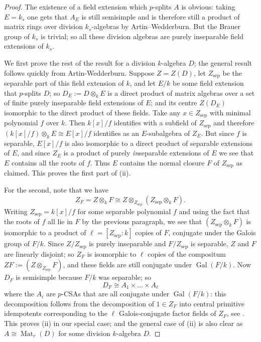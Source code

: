 \documentclass[11pt,reqno]{amsart}
\theoremstyle{definition}
\theoremstyle{remark}
\theoremstyle{definition}
\theoremstyle{plain}
\DeclareMathOperator{\Gal}{Gal}
\DeclareMathOperator{\Mat}{Mat}
\newcommand{\sep}{\mathrm{sep}}
\begin{document}
\begin{proof}
  The existence of a field extension which $p$-splits $A$ is obvious: taking $E=k_s$ one gets that $A_E$ is still semisimple and is therefore still a product of matrix rings over division $k_s$-algebras by Artin--Wedderburn. But the Brauer group of $k_s$ is trivial; so all these division algebras are purely inseparable field extensions of $k_s$.
    
We first prove the rest of the result for a division $k$-algebra $D$; the general result follows quickly from Artin-Wedderburn.
Suppose $Z=Z(D)$, let $Z_\sep$ be the separable part of this field extension of $k$, and
let $E/k$ be some field extension that $p$-splits $D$; so $D_E:=D\otimes_k E$ is a direct product of matrix algebras over a set  of finite purely inseparable field extensions of $E$; and its centre $Z(D_E)$ isomorphic to the direct product of these fields. Take any $x\in Z_\sep$ with minimal polynomial $f$ over $k$. Then $k[x]/f$ identifies with a subfield of $Z_\sep$ and therefore $(k[x]/f)\otimes_k E\cong E[x]/f$ identifies as an $E$-subalgebra of $Z_E$. 
  But since $f$ is separable, $E[x]/f$ is also isomorphic to a direct product of separable extensions of $E$, and since $Z_E$ is a product of purely \emph{in}separable extensions of $E$ we see that $E$ contains all the roots of $f$.
  Thus $E$ contains the normal closure $F$ of $Z_\sep$ as claimed. This proves the first part of (ii).

  For the second, note that we have 
  $$
  Z_F= Z\otimes_k F \cong Z\otimes_{Z_\sep} (Z_\sep\otimes_k F).
  $$ 
  Writing $Z_\sep = k[x]/f$ for some separable polynomial $f$ and using the fact that the roots of $f$ all lie in $F$ by the previous paragraph, we see that $(Z_\sep\otimes_k F)$ is isomorphic to a product of $\ell=[Z_\sep:k]$ copies of $F$, conjugate under the Galois group of $F/k$. 
  Since $Z/Z_\sep$ is purely inseparable and $F/Z_\sep$ is separable, $Z$ and $F$ are linearly disjoint; so $Z_F$ is isomorphic to $\ell$ copies of the compositum $ZF:=(Z\otimes_{Z_\sep}F)$, and these fields are still conjugate under $\Gal(F/k)$. 
  Now $D_F$ is semisimple because $F/k$ was separable; so $$D_F\cong A_1\times \dots\times A_\ell$$ where the $A_i$ are $p$-CSAs that are all conjugate under $\Gal(F/k)$: 
 this decomposition follows from the decomposition of $1\in Z_F$ into central primitive idempotents corresponding to the $\ell$ Galois-conjugate factor fields of $Z_F$, see \cite[7.22]{Lam2}. This proves (ii) in our special case; and the general case of (ii) is also clear as $A\cong \Mat_r(D)$ for some division $k$-algebra $D$.
  

\end{proof}
\end{document}
